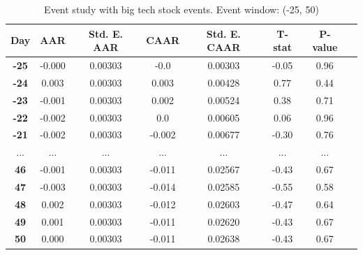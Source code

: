 
\begin{table}[h]
    \centering
    \caption{Event study with big tech stock events. Event window: (-25, 50)}
    \label{tab:esBigTechLong}
    \begin{tabular}{|c|c|c|c|c|c|c|c|}
        \hline
        \textbf{Day} & \textbf{AAR} & \textbf{Std. E. AAR} & \textbf{CAAR} & \textbf{Std. E. CAAR} & \textbf{T-stat} & \textbf{P-value} \\
        \hline
        \textbf{-25} & -0.000 & 0.00303 & -0.0 & 0.00303 & -0.05 & 0.96 \\
        \hline
        \textbf{-24} & 0.003 & 0.00303 & 0.003 & 0.00428 & 0.77 & 0.44 \\
        \hline
        \textbf{-23} & -0.001 & 0.00303 & 0.002 & 0.00524 & 0.38 & 0.71 \\
        \hline
        \textbf{-22} & -0.002 & 0.00303 & 0.0 & 0.00605 & 0.06 & 0.96 \\
        \hline
        \textbf{-21} & -0.002 & 0.00303 & -0.002 & 0.00677 & -0.30 & 0.76 \\
        \hline
        ... & ... & ... & ... & ... & ... & ... \\
        \hline
        \textbf{46} & -0.001 & 0.00303 & -0.011 & 0.02567 & -0.43 & 0.67 \\
        \hline
        \textbf{47} & -0.003 & 0.00303 & -0.014 & 0.02585 & -0.55 & 0.58 \\
        \hline
        \textbf{48} & 0.002 & 0.00303 & -0.012 & 0.02603 & -0.47 & 0.64 \\
        \hline
        \textbf{49} & 0.001 & 0.00303 & -0.011 & 0.02620 & -0.43 & 0.67 \\
        \hline
        \textbf{50} & 0.000 & 0.00303 & -0.011 & 0.02638 & -0.43 & 0.67 \\
        \hline
    \end{tabular}
\end{table}


